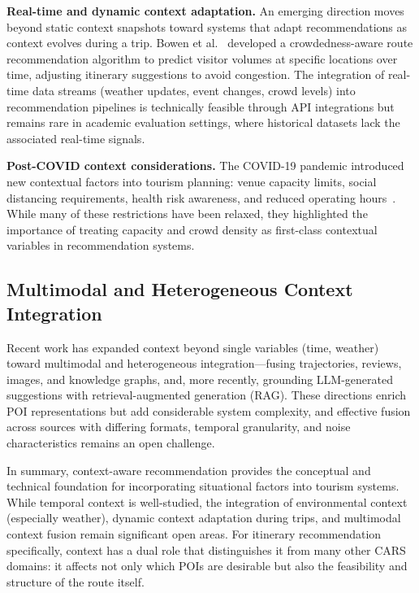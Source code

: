 \textbf{Real-time and dynamic context adaptation.} An emerging direction moves beyond static context snapshots toward systems that adapt recommendations as context evolves during a trip. Bowen et al.~\cite{bowen2020crowdedness} developed a crowdedness-aware route recommendation algorithm to predict visitor volumes at specific locations over time, adjusting itinerary suggestions to avoid congestion. The integration of real-time data streams (weather updates, event changes, crowd levels) into recommendation pipelines is technically feasible through API integrations but remains rare in academic evaluation settings, where historical datasets lack the associated real-time signals.

\textbf{Post-COVID context considerations.} The COVID-19 pandemic introduced new contextual factors into tourism planning: venue capacity limits, social distancing requirements, health risk awareness, and reduced operating hours~\cite{halder2022thesis}. While many of these restrictions have been relaxed, they highlighted the importance of treating capacity and crowd density as first-class contextual variables in recommendation systems.

\subsection{Multimodal and Heterogeneous Context Integration}
\label{sec:sota-cars-multimodal}

Recent work has expanded context beyond single variables (time, weather) toward multimodal and heterogeneous integration---fusing trajectories, reviews, images, and knowledge graphs, and, more recently, grounding LLM-generated suggestions with retrieval-augmented generation (RAG). These directions enrich POI representations but add considerable system complexity, and effective fusion across sources with differing formats, temporal granularity, and noise characteristics remains an open challenge.

\medskip

In summary, context-aware recommendation provides the conceptual and technical foundation for incorporating situational factors into tourism systems. While temporal context is well-studied, the integration of environmental context (especially weather), dynamic context adaptation during trips, and multimodal context fusion remain significant open areas. For itinerary recommendation specifically, context has a dual role that distinguishes it from many other CARS domains: it affects not only which POIs are desirable but also the feasibility and structure of the route itself.

